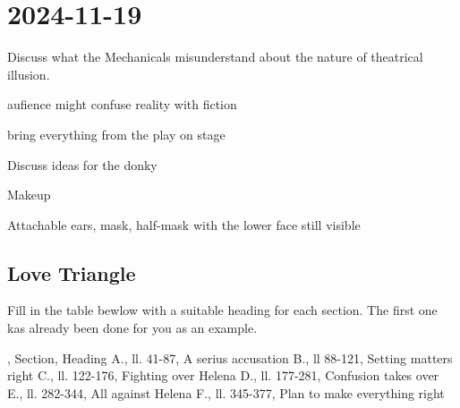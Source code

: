 \section{2024-11-19}

\startitemize[packed]
\item Discuss what the Mechanicals misunderstand about the nature of theatrical illusion.
\startitemize[packed]
\item aufience might confuse reality with fiction
\item bring everything from the play on stage
\stopitemize
\item Discuss ideas for the donky
\startitemize[packed]
\item Makeup
\item Attachable ears, mask, half-mask with the lower face still visible
\stopitemize
\stopitemize

\subsection{Love Triangle}

\startframedtask
Fill in the table bewlow with a suitable heading for each section. The first
one kas already been done for you as an example.
\stopframedtask

\startplacetable[location={here},title={Headings}]
\setupTABLE[r][even][background=color,backgroundcolor=lightgray]
\setupTABLE[r][1][background=color,backgroundcolor=gray]
\bTABLE[frame=off,offset=1mm]
\startCSV
,   Section,     Heading
A., ll. 41-87,   A serius accusation
B., ll 88-121,   Setting matters right
C., ll. 122-176, Fighting over Helena
D., ll. 177-281, Confusion takes over
E., ll. 282-344, All against Helena
F., ll. 345-377, Plan to make everything right
\stopCSV
\eTABLE
\stopplacetable
